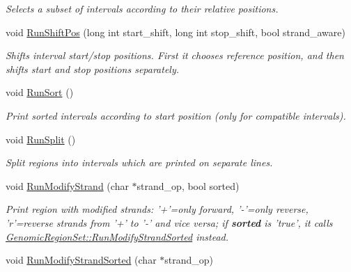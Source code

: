 \begin{CompactItemize}
\begin{CompactList}\small\item\em Selects a subset of intervals according to their relative positions. \item\end{CompactList}\item 
void \hyperlink{classGenomicRegionSet_0c9ba06ad5aff586193ba765e6d13a27}{RunShiftPos} (long int start\_\-shift, long int stop\_\-shift, bool strand\_\-aware)
\begin{CompactList}\small\item\em Shifts interval start/stop positions. First it chooses reference position, and then shifts start and stop positions separately. \item\end{CompactList}\item 
\hypertarget{classGenomicRegionSet_53143cb3271c65fb289faece622cd8bd}{
void \hyperlink{classGenomicRegionSet_53143cb3271c65fb289faece622cd8bd}{RunSort} ()}
\label{classGenomicRegionSet_53143cb3271c65fb289faece622cd8bd}

\begin{CompactList}\small\item\em Print sorted intervals according to start position (only for compatible intervals). \item\end{CompactList}\item 
\hypertarget{classGenomicRegionSet_570e56362af1b30e7f5cb149ea42e54e}{
void \hyperlink{classGenomicRegionSet_570e56362af1b30e7f5cb149ea42e54e}{RunSplit} ()}
\label{classGenomicRegionSet_570e56362af1b30e7f5cb149ea42e54e}

\begin{CompactList}\small\item\em Split regions into intervals which are printed on separate lines. \item\end{CompactList}\item 
\hypertarget{classGenomicRegionSet_f1146729843b82d7637e0adc1b07e51a}{
void \hyperlink{classGenomicRegionSet_f1146729843b82d7637e0adc1b07e51a}{RunModifyStrand} (char $\ast$strand\_\-op, bool sorted)}
\label{classGenomicRegionSet_f1146729843b82d7637e0adc1b07e51a}

\begin{CompactList}\small\item\em Print region with modified strands: '+'=only forward, '-'=only reverse, 'r'=reverse strands from '+' to '-' and vice versa; if {\bf sorted} is 'true', it calls \hyperlink{classGenomicRegionSet_7c0a328896b88a0c837f60e89fd85584}{GenomicRegionSet::RunModifyStrandSorted} instead. \item\end{CompactList}\item 
\hypertarget{classGenomicRegionSet_7c0a328896b88a0c837f60e89fd85584}{
void \hyperlink{classGenomicRegionSet_7c0a328896b88a0c837f60e89fd85584}{RunModifyStrandSorted} (char $\ast$strand\_\-op)}
\label{classGenomicRegionSet_7c0a328896b88a0c837f60e89fd85584}


\end{CompactItemize}
